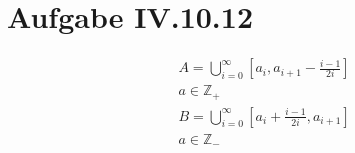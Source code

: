\documentclass[12pt,a4paper]{article}
\begin{document}
\pagestyle{fancy}
\fancyhf{}
\rfoot{\thepage}

\section{Aufgabe IV.10.12}
\begin{align*}
    &A = \bigcup_{i = 0}^{\infty}[a_i, a_{i+1} -\frac{i-1}{2i}]\\
    &a \in \mathbb{Z_+}\\
    &B = \bigcup_{i = 0}^{\infty}[a_i+\frac{i-1}{2i}, a_{i+1} ]\\
    &a \in \mathbb{Z_-}\\
\end{align*}
\end{document}

